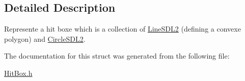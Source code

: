 \subsection{Detailed Description}
Represente a hit boxe which is a collection of \hyperlink{structLineSDL2}{Line\+S\+D\+L2} (defining a convexe polygon) and \hyperlink{structCircleSDL2}{Circle\+S\+D\+L2}. 

The documentation for this struct was generated from the following file\+:\begin{DoxyCompactItemize}
\item 
\hyperlink{HitBox_8h}{Hit\+Box.\+h}\end{DoxyCompactItemize}
